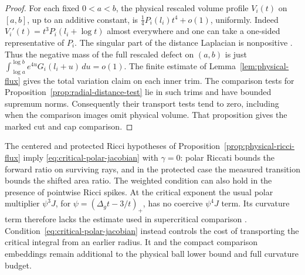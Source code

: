 \begin{proof}
For each fixed \(0<a<b\), the physical rescaled volume
profile \(V_i(t)\) on \([a,b]\), up to an additive
constant, is \(\tfrac14 P_i(l_i)t^4+o(1)\), uniformly.
Indeed \(V_i'(t)=t^3 P_i(l_i+\log t)\) almost everywhere
and one can take a one-sided representative of \(P_i\).
The singular part of the distance Laplacian is nonpositive
\cite[Corollaries~2.11--2.12]{MantegazzaMascellaniUraltsev2014DistanceHessian}.
Thus the negative mass of the full rescaled defect
on \((a,b)\) is just
\(\int_{\log a}^{\log b}e^{4u}G_i(l_i+u)\,du=o(1)\).
The finite estimate of Lemma~\ref{lem:physical-flux}
gives the total variation claim on each inner trim.
The comparison tests for Proposition~\ref{prop:radial-distance-test}
lie in such trims and have bounded supremum norms.
Consequently their transport tests tend to zero, including
when the comparison images omit physical volume. That
proposition gives the marked cut and cap comparison.
\end{proof}

The centered and protected Ricci hypotheses of
Proposition~\ref{prop:physical-ricci-flux} imply
\eqref{eq:critical-polar-jacobian} with \(\gamma=0\):
polar Riccati bounds the forward ratio on surviving rays,
and in the protected case the measured transition bounds
the shifted area ratio. The weighted condition can
also hold in the presence of pointwise Ricci spikes.
At the critical exponent the usual polar multiplier
\(\psi^3 J\), for \(\psi=(\Delta_g t-3/t)_+\),
has no coercive \(\psi^4J\) term. Its curvature term
therefore lacks the estimate used in supercritical
comparison \cite[Theorem~2.1]{DaiWeiZhang2018Local}.
Condition~\eqref{eq:critical-polar-jacobian} instead
controls the cost of transporting the critical integral
from an earlier radius. It and the compact comparison
embeddings remain additional to the physical ball lower
bound and full curvature budget.
